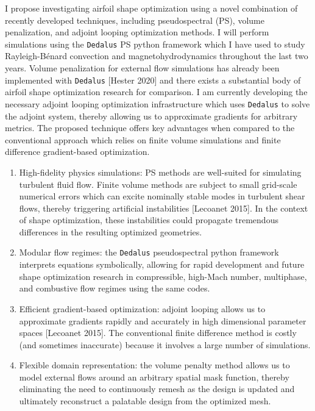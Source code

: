 \documentclass[11pt]{article}
\begin{document}
I propose investigating airfoil shape optimization using a novel combination of recently developed techniques, including pseudospectral (PS), volume penalization, and adjoint looping optimization methods.
I will perform simulations using the \texttt{Dedalus} PS python framework which I have used to study Rayleigh-B\'enard convection and magnetohydrodynamics throughout the last two years. 
Volume penalization for external flow simulations has already been implemented with \texttt{Dedalus} [Hester 2020] and there exists a substantial body of airfoil shape optimization research for comparison. 
I am currently developing the necessary adjoint looping optimization infrastructure which uses \texttt{Dedalus} to solve the adjoint system, thereby allowing us to approximate gradients for arbitrary metrics.
The proposed technique offers key advantages when compared to the conventional approach which relies on finite volume simulations and finite difference gradient-based optimization. 
\begin{enumerate}
  \item High-fidelity physics simulations: PS methods are well-suited for simulating turbulent fluid flow. Finite volume methods are subject to small grid-scale numerical errors which can excite nominally stable modes in turbulent shear flows, thereby triggering artificial instabilities [Lecoanet 2015]. In the context of shape optimization, these instabilities could propagate tremendous differences in the resulting optimized geometries.
  \item Modular flow regimes: the \texttt{Dedalus} pseudospectral python framework interprets equations symbolically, allowing for rapid development and future shape optimization research in compressible, high-Mach number, multiphase, and combustive flow regimes using the same codes.
  \item Efficient gradient-based optimization: adjoint looping allows us to approximate gradients rapidly and accurately in high dimensional parameter spaces [Lecoanet 2015]. The conventional finite difference method is costly (and sometimes inaccurate) because it involves a large number of simulations.
  \item Flexible domain representation: the volume penalty method allows us to model external flows around an arbitrary spatial mask function, thereby eliminating the need to continuously remesh as the design is updated and ultimately reconstruct a palatable design from the optimized mesh.
\end{enumerate}
\end{document}
